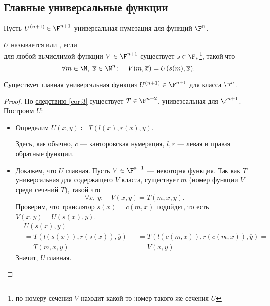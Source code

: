 
\subsection{Главные универсальные функции}
\begin{defn}[]
	Пусть $ U^{(n+1)} \in \F^{n+1}$ универсальная нумерация для функций $ \F^{n}$. 

	\noindent
	$U$ называется  или , если \\ для любой вычислимой функции $V \in \F^{n+1}$  существует  $ s \in \F_{*}$\footnote{по номеру сечения $ V$ находит какой-то номер такого же сечения $ U$}, такой что 
	\[
		\forall m \in \N,~ \overline{x} \in \N^{n} \colon \quad V(m, \overline{x}) = U(s(m), \overline{x}) 
	.\] 
\end{defn}


\begin{thm}
	Существует главная универсальная функция $ U^{(n + 1)} \in \F^{n+1} $ для класса $ \F^{n}$.
\end{thm}
\begin{proof}
	По \hyperref[cor:3]{следствию \ref{cor:3}} существует $ T \in \F^{n+2}$, универсальная для $ \F^{n+1}$. Построим $ U$:
	\begin{itemize}
		\item Определим $ U(x, \overline{y}) \coloneqq T(l(x), r(x), \overline{y})$.

		Здесь, как обычно, $ c$ --- канторовская нумерация, $ l, r$ --- левая и правая обратные функции. 
	\item Докажем, что $ U$ главная. Пусть $ V \in \F^{n+1}$ --- некоторая функция.
		Так как $ T$ универсальная для содержащего $ V$ класса, существует $ m$ (номер функции $ V$ среди сечений $ T$), такой что
			\[
				\forall x,~ \overline{y}\colon \quad V(x, \overline{y}) = T(m, x, \overline{y})
			.\] 
			Проверим, что транслятор $ s(x) = c(m, x)$ подойдет, то есть $ V(x, \overline{y}) = U(s(x), \overline{y})$.
			\begin{align*}
				&U(s(x), \overline{y})  &&= \tag{По определению $ U$} \\
				&= T(l(s(x)), r(s(x)), \overline{y}) &&= T(l(c(m, x)), r(c(m, x)), \overline{y}) = \\
				&= T(m, x, \overline{y}) && = V(x, \overline{y})
			\end{align*}
			Значит, $ U$ главная.
	\end{itemize}
\end{proof}


